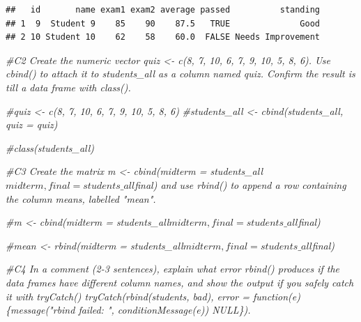 \documentclass[
]{article}
\newenvironment{Shaded}{\begin{snugshade}}{\end{snugshade}}
\newcommand{\CommentTok}[1]{\textcolor[rgb]{0.56,0.35,0.01}{\textit{#1}}}
\begin{document}
\begin{verbatim}
##   id       name exam1 exam2 average passed          standing
## 1  9  Student 9    85    90    87.5   TRUE              Good
## 2 10 Student 10    62    58    60.0  FALSE Needs Improvement
\end{verbatim}

\begin{Shaded}
\begin{Highlighting}[]
\CommentTok{\#C2 Create the numeric vector quiz \textless{}{-} c(8, 7, 10, 6, 7, 9, 10, 5, 8, 6). Use cbind() to attach it to students\_all as a column named quiz. Confirm the result is till a data frame with class().}

\CommentTok{\#quiz \textless{}{-} c(8, 7, 10, 6, 7, 9, 10, 5, 8, 6)}
\CommentTok{\#students\_all \textless{}{-} cbind(students\_all, quiz = quiz)}

\CommentTok{\#class(students\_all)}
\end{Highlighting}
\end{Shaded}

\begin{Shaded}
\begin{Highlighting}[]
\CommentTok{\#C3 Create the matrix m \textless{}{-} cbind(midterm = students\_all$midterm, final = students\_all$final) and use rbind() to append a row containing the column means, labelled "mean".}

\CommentTok{\#m \textless{}{-} cbind(midterm = students\_all$midterm, final = students\_all$final)}

\CommentTok{\#mean \textless{}{-} rbind(midterm = students\_all$midterm, final = students\_all$final)}
\end{Highlighting}
\end{Shaded}

\begin{Shaded}
\begin{Highlighting}[]
\CommentTok{\#C4 In a comment (2{-}3 sentences), explain what error rbind() produces if the data frames have different column names, and show the  output if you safely catch it with tryCatch() tryCatch(rbind(students, bad), error = function(e) \{message("rbind failed: ", conditionMessage(e)) NULL\}).}
\end{Highlighting}
\end{Shaded}
\end{document}
